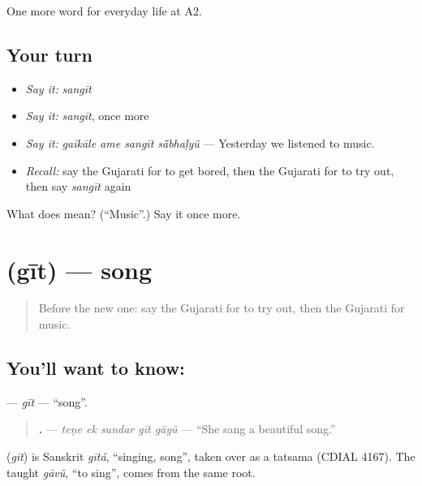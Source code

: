 \begin{grammarlens}[title={What you've built}]
One more word for everyday life at A2.
\end{grammarlens}

\subsection*{Your turn}
\begin{itemize}
\raggedright
  \item \emph{Say it:} \emph{sangīt}
  \item \emph{Say it:} \emph{sangīt}, once more
  \item \emph{Say it:} \emph{gaīkāle ame sangīt sā̃bhaḷyũ} — Yesterday we listened to music.
  \item \emph{Recall:} say the Gujarati for to get bored, then the Gujarati for to try out, then say \emph{sangīt} again
\end{itemize}

\begin{tcolorbox}[breakable,colback=teal!4,colframe=teal!35!black,title={Before you move on}]
What does  mean? (\textquotedblleft{}Music\textquotedblright{}.) Say it once more.
\end{tcolorbox}
\section[\texorpdfstring{\gu{ગીત} (gīt)}{ગીત (gīt)}]{ (gīt) — song}

\label{lesson:GU-C254-git}



\begin{quote}
Before the new one: say the Gujarati for to try out, then the Gujarati for music.
\end{quote}

\subsection*{You'll want to know: }
\textbf{} — \emph{gīt} — \textquotedblleft{}song\textquotedblright{}.

\begin{quote}
\textbf{    .} — \emph{teṇe ek sundar gīt gāyũ} — \textquotedblleft{}She sang a beautiful song.\textquotedblright{}
\end{quote}

\begin{cousinweb}
\textbf{} (\emph{gīt}) is Sanskrit \emph{gītá}, \textquotedblleft{}singing, song\textquotedblright{}, taken over as a tatsama (CDIAL 4167). The taught \emph{gāvũ}, \textquotedblleft{}to sing\textquotedblright{}, comes from the same root.
\end{cousinweb}


